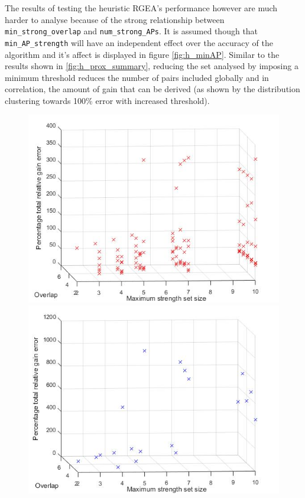 \documentclass{UoYCSproject}
\begin{document}
                The results of testing the heuristic RGEA's performance however are much harder to analyse because of the strong relationship between \texttt{min\_strong\_overlap} and \texttt{num\_strong\_APs}. It is assumed though that \texttt{min\_AP\_strength} will have an independent effect over the accuracy of the algorithm and it's affect is displayed in figure \ref{fig:h_minAP}. Similar to the results shown in \ref{fig:h_prox_summary}, reducing the set analysed by imposing a minimum threshold reduces the number of pairs included globally and in correlation, the amount of gain that can be derived (as shown by the distribution clustering towards 100\% error with increased threshold).
                
                \begin{figure}[h]
                    \label{fig:h_overlap}
                    \centering
                    \begin{minipage}{0.5\textwidth}
                        \centering
                        \includegraphics[width=1\textwidth]{h_overlap.jpg}
                    \end{minipage}\hfill
                    \begin{minipage}{0.5\textwidth}
                        \centering
                        \includegraphics[width=1\textwidth]{h_overlap_anomalous.jpg}

\end{minipage}
\end{figure}
\end{document}
